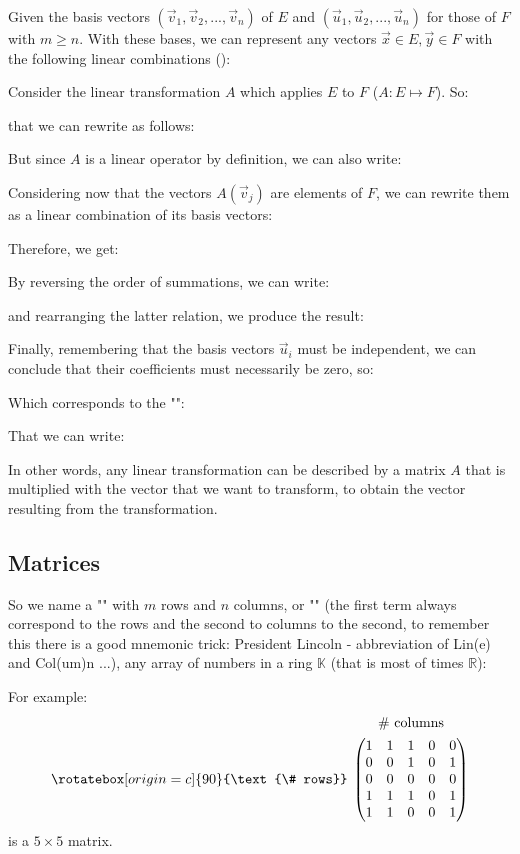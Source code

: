 Given the basis vectors $\left(\vec{v}_1,\vec{v}_2,...,\vec{v}_n \right)$ of $E$ and $\left(\vec{u}_1,\vec{u}_2,...,\vec{u}_n \right)$ for those of $F$ with $m \geq n$. With these bases, we can represent any vectors $\vec{x} \in E, \vec{y} \in F$ with the following linear combinations ():
	
	Consider the linear transformation $A$ which applies $E$ to $F$ ($A:E\mapsto F$). So:
			
	that we can rewrite as follows:
	
	But since $A$ is a linear operator by definition, we can also write:
	
	Considering now that the vectors $A(\vec{v}_j)$ are elements of $F$, we can rewrite them as a linear combination of its basis vectors:
	
	Therefore, we get:
	
	By reversing the order of summations, we can write:
	
	and rearranging the latter relation, we produce the result:
	
	Finally, remembering that the basis vectors $\vec{u}_i$  must be independent, we can conclude that their coefficients must necessarily be zero, so:
	
	Which corresponds to the "":
	
	That we can write:
	
	In other words, any linear transformation can be described by a matrix $A$ that is multiplied with the vector that we want to transform, to obtain the vector resulting from the transformation.
	
	\pagebreak
	\subsection{Matrices}
	So we name a "" with $m$ rows and $n$ columns, or "" (the first term always correspond to the rows and the second to columns to the second, to remember this there is a good mnemonic trick: President Lincoln - abbreviation of Lin(e) and Col(um)n ...), any array of numbers in a ring $\mathbb{K}$ (that is most of times $\mathbb{R}$):
	
	For example:
	\begin{equation}
	\begin{array}{@{}c@{\hspace{1ex}}c@{}}
	 & \text{\# columns} \\[1ex]
	\rotatebox[origin=c]{90}{\text{\# rows}} &
	\begin{pmatrix}
	  1 & 1 & 1 & 0 & 0\\
	  0 & 0 & 1 & 0 & 1\\
	  0 & 0 & 0 & 0 & 0\\
	  1 & 1 & 1 & 0 & 1\\
	  1 & 1 & 0 & 0 & 1\\
	 \end{pmatrix}
	\end{array}
	\end{equation}
	is a $5\times 5$ matrix.
	

